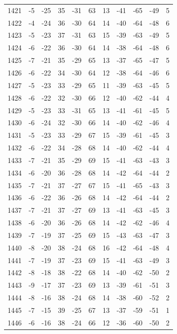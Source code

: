 \begin{table}[H]
\begin{tabular}{lllllllllll}
1421 & -5 & -25 & 35 & -31 & 63 & 13 & -41 & -65 & -49 & 5 \\
1422 & -4 & -24 & 36 & -30 & 64 & 14 & -40 & -64 & -48 & 6 \\
1423 & -5 & -23 & 37 & -31 & 63 & 15 & -39 & -63 & -49 & 5 \\
1424 & -6 & -22 & 36 & -30 & 64 & 14 & -38 & -64 & -48 & 6 \\
1425 & -7 & -21 & 35 & -29 & 65 & 13 & -37 & -65 & -47 & 5 \\
1426 & -6 & -22 & 34 & -30 & 64 & 12 & -38 & -64 & -46 & 6 \\
1427 & -5 & -23 & 33 & -29 & 65 & 11 & -39 & -63 & -45 & 5 \\
1428 & -6 & -22 & 32 & -30 & 66 & 12 & -40 & -62 & -44 & 4 \\
1429 & -5 & -23 & 33 & -31 & 65 & 13 & -41 & -61 & -45 & 5 \\
1430 & -6 & -24 & 32 & -30 & 66 & 14 & -40 & -62 & -46 & 4 \\
1431 & -5 & -23 & 33 & -29 & 67 & 15 & -39 & -61 & -45 & 3 \\
1432 & -6 & -22 & 34 & -28 & 68 & 14 & -40 & -62 & -44 & 4 \\
1433 & -7 & -21 & 35 & -29 & 69 & 15 & -41 & -63 & -43 & 3 \\
1434 & -6 & -20 & 36 & -28 & 68 & 14 & -42 & -64 & -44 & 2 \\
1435 & -7 & -21 & 37 & -27 & 67 & 15 & -41 & -65 & -43 & 3 \\
1436 & -6 & -22 & 36 & -26 & 68 & 14 & -42 & -64 & -44 & 2 \\
1437 & -7 & -21 & 37 & -27 & 69 & 13 & -41 & -63 & -45 & 3 \\
1438 & -6 & -20 & 36 & -26 & 68 & 14 & -42 & -62 & -46 & 4 \\
1439 & -7 & -19 & 37 & -25 & 69 & 15 & -43 & -63 & -47 & 3 \\
1440 & -8 & -20 & 38 & -24 & 68 & 16 & -42 & -64 & -48 & 4 \\
1441 & -7 & -19 & 37 & -23 & 69 & 15 & -41 & -63 & -49 & 3 \\
1442 & -8 & -18 & 38 & -22 & 68 & 14 & -40 & -62 & -50 & 2 \\
1443 & -9 & -17 & 37 & -23 & 69 & 13 & -39 & -61 & -51 & 3 \\
1444 & -8 & -16 & 38 & -24 & 68 & 14 & -38 & -60 & -52 & 2 \\
1445 & -7 & -15 & 39 & -25 & 67 & 13 & -37 & -59 & -51 & 1 \\
1446 & -6 & -16 & 38 & -24 & 66 & 12 & -36 & -60 & -50 & 2 \\

\end{tabular}
\end{table}

